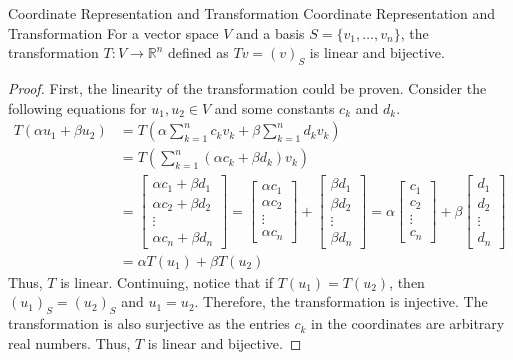 \documentclass[../main.tex]{subfiles}
\begin{document}
\begin{theorem}{Coordinate Representation and Transformation}
{Coordinate Representation and Transformation}
For a vector space $V$ and a basis $S = \{ v_1, \ldots, v_n \}$,
the transformation $T: V \to \mathbb{R}^n$ defined as $Tv = (v)_S$
is linear and bijective.
\end{theorem}
\begin{proof}
First, the linearity of the transformation could be proven.
Consider the following equations for $u_1, u_2 \in V$ and some
constants $c_k$ and $d_k$.
\begin{align*}
    T(\alpha u_1 + \beta u_2)
    &= T \left(
        \alpha \sum_{k=1}^n c_k v_k + \beta \sum_{k=1}^n d_k v_k
    \right) \\
    &= T \left( \sum_{k=1}^n (\alpha c_k + \beta d_k) v_k \right) \\
    &=
    \begin{bmatrix}
        \scriptstyle \alpha c_1 + \beta d_1 \\
        \scriptstyle \alpha c_2 + \beta d_2 \\
        \scriptstyle \vdots \\
        \scriptstyle \alpha c_n + \beta d_n
    \end{bmatrix}
    =
    \begin{bmatrix}
        \scriptstyle \alpha c_1 \\
        \scriptstyle \alpha c_2 \\
        \scriptstyle \vdots \\
        \scriptstyle \alpha c_n
    \end{bmatrix}
    +
    \begin{bmatrix}
        \scriptstyle \beta d_1 \\
        \scriptstyle \beta d_2 \\
        \scriptstyle \vdots \\
        \scriptstyle \beta d_n
    \end{bmatrix}
    =
    \alpha
    \begin{bmatrix}
        c_1 \\
        c_2 \\
        \vdots \\
        c_n
    \end{bmatrix}
    +
    \beta
    \begin{bmatrix}
        d_1 \\
        d_2 \\
        \vdots \\
        d_n
    \end{bmatrix} \\
    &= \alpha T(u_1) + \beta T(u_2)
\end{align*}
Thus, $T$ is linear. Continuing, notice that if $T(u_1) = T(u_2)$,
then $(u_1)_S = (u_2)_S$ and $u_1 = u_2$. Therefore, the
transformation is injective. The transformation is also surjective
as the entries $c_k$ in the coordinates are arbitrary real numbers.
Thus, $T$ is linear and bijective.
\end{proof}
\end{document}
